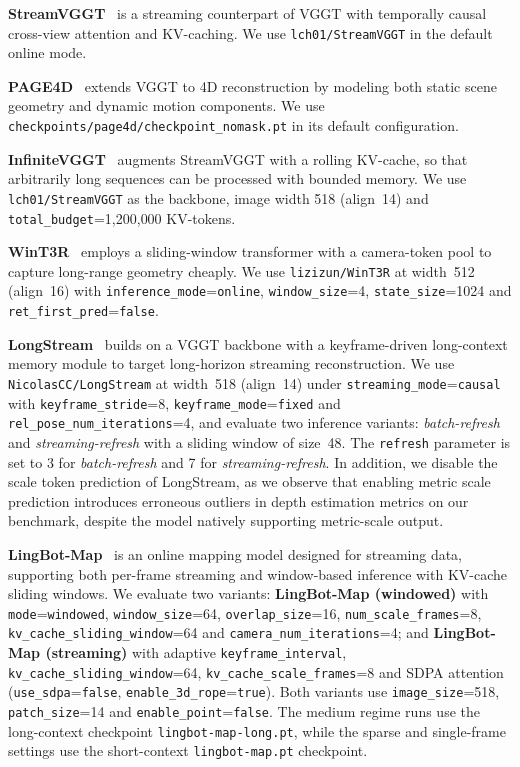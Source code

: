 \documentclass{llmxive}
\begin{document}
\textbf{StreamVGGT}~\citep{streamVGGT} is a streaming counterpart of VGGT with temporally causal cross-view attention and KV-caching.
%
We use \texttt{lch01/StreamVGGT} in the default online mode.

\textbf{PAGE4D}~\citep{zhou2025page4d} extends VGGT to 4D reconstruction by modeling both static scene geometry and dynamic motion components.
%
We use \texttt{checkpoints/page4d/checkpoint\_nomask.pt} in its default configuration.

\textbf{InfiniteVGGT}~\citep{yuan2026infinitevggt} augments StreamVGGT with a rolling KV-cache, so that arbitrarily long sequences can be processed with bounded memory.
%
We use \texttt{lch01/StreamVGGT} as the backbone, image width 518 (align~14) and \texttt{total\_budget}=1{,}200{,}000 KV-tokens.

\textbf{WinT3R}~\citep{li2025wint3r} employs a sliding-window transformer with a camera-token pool to capture long-range geometry cheaply.
%
We use \texttt{lizizun/WinT3R} at width~512 (align~16) with \texttt{inference\_mode}=\texttt{online}, \texttt{window\_size}=4, \texttt{state\_size}=1024 and \texttt{ret\_first\_pred}=\texttt{false}.

\textbf{LongStream}~\citep{cheng2026longstream} builds on a VGGT backbone with a keyframe-driven long-context memory module to target long-horizon streaming reconstruction.
%
We use \texttt{NicolasCC/LongStream} at width~518 (align~14) under \texttt{streaming\_mode}=\texttt{causal} with \texttt{keyframe\_stride}=8, \texttt{keyframe\_mode}=\texttt{fixed} and \texttt{rel\_pose\_num\_iterations}=4, and evaluate two inference variants: \emph{batch-refresh} and \emph{streaming-refresh} with a sliding window of size~48.
%
The \texttt{refresh} parameter is set to 3 for \emph{batch-refresh} and 7 for \emph{streaming-refresh}.
%
In addition, we disable the scale token prediction of LongStream, as we observe that enabling metric scale prediction introduces erroneous outliers in depth estimation metrics on our benchmark, despite the model natively supporting metric-scale output.


\textbf{LingBot-Map}~\citep{chen2026lingbotmap} is an online mapping model designed for streaming data, supporting both per-frame streaming and window-based inference with KV-cache sliding windows.
%
We evaluate two variants: \textbf{LingBot-Map (windowed)} with \texttt{mode}=\texttt{windowed}, \texttt{window\_size}=64, \texttt{overlap\_size}=16, \texttt{num\_scale\_frames}=8, \texttt{kv\_cache\_sliding\_window}=64 and \texttt{camera\_num\_iterations}=4; and \textbf{LingBot-Map (streaming)} with adaptive \texttt{keyframe\_interval}, \texttt{kv\_cache\_sliding\_window}=64, \texttt{kv\_cache\_scale\_frames}=8 and SDPA attention (\texttt{use\_sdpa}=\texttt{false}, \texttt{enable\_3d\_rope}=\texttt{true}). Both variants use \texttt{image\_size}=518, \texttt{patch\_size}=14 and \texttt{enable\_point}=\texttt{false}. The medium regime runs use the long-context checkpoint \texttt{lingbot-map-long.pt}, while the sparse and single-frame settings use the short-context \texttt{lingbot-map.pt} checkpoint.
\end{document}
